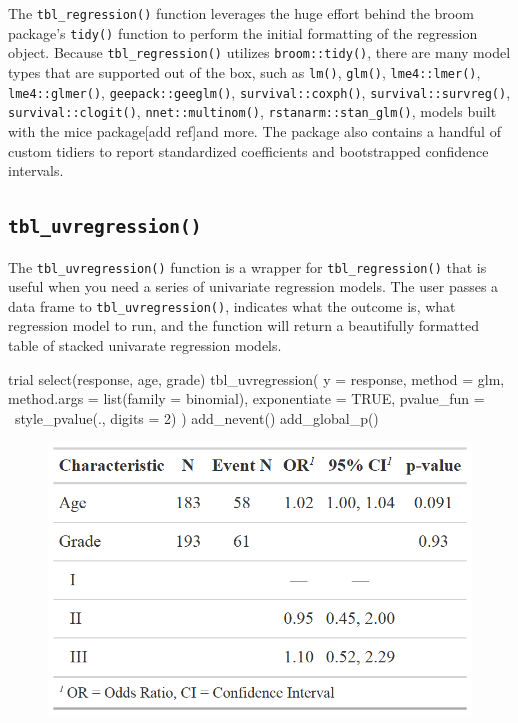 The \texttt{tbl\_regression()} function leverages the huge effort behind the broom package's \texttt{tidy()} function \citep{broom} to perform the initial formatting of the regression object.
Because \texttt{tbl\_regression()} utilizes \texttt{broom::tidy()}, there are many model types that are supported out of the box, such as \texttt{lm()}, \texttt{glm()}, \texttt{lme4::lmer()}, \texttt{lme4::glmer()}, \texttt{geepack::geeglm()}, \texttt{survival::coxph()}, \texttt{survival::survreg()}, \texttt{survival::clogit()}, \texttt{nnet::multinom()}, \texttt{rstanarm::stan\_glm()}, models built with the mice package[add ref]and more. The  package also contains a handful of custom tidiers to report standardized coefficients and bootstrapped confidence intervals.

\subsection{\texorpdfstring{\texttt{tbl\_uvregression()}}{tbl\_uvregression()}}

The \texttt{tbl\_uvregression()} function is a wrapper for \texttt{tbl\_regression()} that is useful when you need a series of univariate regression models.
The user passes a data frame to \texttt{tbl\_uvregression()}, indicates what the outcome is, what regression model to run, and the function will return a beautifully formatted table of stacked univarate regression models.

\begin{example}
trial %
  select(response, age, grade) %
  tbl_uvregression(
    y = response, 
    method = glm,
    method.args = list(family = binomial),
    exponentiate = TRUE,
    pvalue_fun = ~style_pvalue(., digits = 2)
  ) %
  add_nevent() %
  add_global_p()
\end{example}

\begin{figure}[h!]
  \includegraphics[scale=0.28]{uvregression.png}
  \centering
\end{figure}

